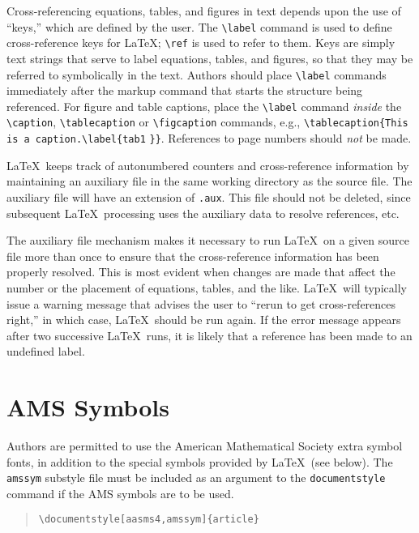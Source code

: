 Cross-referencing equations, tables, and figures
in text depends upon the use of ``keys,'' which
are defined by the user.  The \verb"\label" command is used
to define cross-reference keys for \LaTeX; \verb"\ref" is used to
refer to them.  Keys are simply text strings that
serve to label equations, tables, and  figures, so that
they may be referred to symbolically in the text.
Authors should place \verb"\label" commands immediately
after the markup command that starts the structure being referenced.
For figure and table captions, place the \verb"\label" command {\sl inside}
the \verb"\caption", \verb"\tablecaption" or \verb"\figcaption" commands, 
e.g., \verb"\tablecaption{This is a caption.\label{tab1" \linebreak \verb"}}".
References to page numbers should {\sl not} be made.

\LaTeX\ keeps track of autonumbered counters and cross-reference
information by maintaining an auxiliary file in the same working
directory as the source file.  The auxiliary file will have an
extension of {\tt .aux}.  This file should not be deleted, since
subsequent \LaTeX\ processing uses the auxiliary data to resolve
references, etc.

The auxiliary file mechanism makes it necessary to run \LaTeX\
on a given source file more than once to
ensure that the cross-reference information has been properly resolved.
This is most evident when changes are made that affect the number
or the placement of equations, tables, and the like.
\LaTeX\ will typically issue a warning message that advises
the user to ``rerun to get cross-references right,''
in which case, \LaTeX\ should be run again.
If the error message appears after two successive \LaTeX\ runs,
it is likely that a reference has been made to an undefined label.

\section{AMS Symbols}    \label{ams} 

Authors are permitted to use the American Mathematical
Society extra symbol fonts, in addition to the special symbols provided by 
\LaTeX\ (see below).  The {\tt amssym} substyle file must be
included as an argument to the {\tt documentstyle} command if the AMS symbols
are to be used. 

\begin{quote}
\verb"\documentstyle[aasms4,amssym]{article}"
\end{quote}

